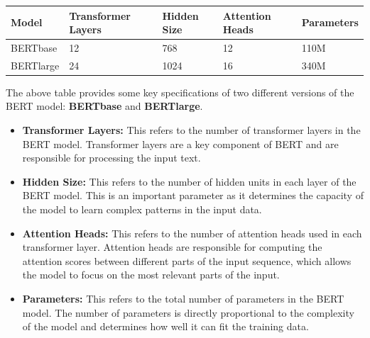 \begin{table}[!htbp]
\centering

\begin{tabular}{| l | l | l | l | l |}
\hline
Model & Transformer Layers & Hidden Size & Attention Heads & Parameters \\
\hline

\hline
BERTbase & 12 & 768 & 12 & 110M \\
\hline
BERTlarge & 24 & 1024 & 16 & 340M \\
\hline

\end{tabular}

\end{table}

The above table provides some key specifications of two different versions of the BERT model: \textbf{BERTbase} and \textbf{BERTlarge}.

\begin{itemize}
    \item \textbf{Transformer Layers:} This refers to the number of transformer layers in the BERT model. Transformer layers are a key component of BERT and are responsible for processing the input text.
    \item \textbf{Hidden Size:} This refers to the number of hidden units in each layer of the BERT model. This is an important parameter as it determines the capacity of the model to learn complex patterns in the input data.
    \item \textbf{Attention Heads:} This refers to the number of attention heads used in each transformer layer. Attention heads are responsible for computing the attention scores between different parts of the input sequence, which allows the model to focus on the most relevant parts of the input.
    \item \textbf{Parameters:} This refers to the total number of parameters in the BERT model. The number of parameters is directly proportional to the complexity of the model and determines how well it can fit the training data.
\end{itemize}


